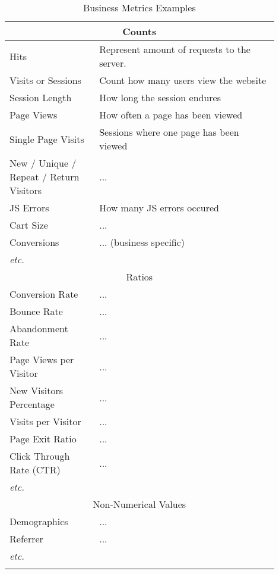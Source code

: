 \begin{center}
	\small
	\begin{longtable}{ | p{0.3\linewidth} | p{0.6\linewidth} | }
	
	\hline
	\multicolumn{2}{|c|}{ \cellcolor{lightgrey} Counts} \\
	\hline
	Hits & Represent amount of requests to the server.  \\ %
	\hline
	Visits or Sessions & Count how many users view the website \\ %
	\hline
	Session Length & How long the session endures \\ %
	\hline
	Page Views & How often a page has been viewed \\ %
	\hline
	Single Page Visits & Sessions where one page has been viewed \\ %
	\hline
	New / Unique / Repeat / Return Visitors & ... \\
	\hline
	JS Errors & How many JS errors occured \\
	\hline
	Cart Size & ... \\
	\hline
	Conversions & ...  (business specific) \\
	\hline
	\textit{etc.} &  \\

	\hline
	\multicolumn{2}{|c|}{ \cellcolor{lightgrey} Ratios} \\
	\hline
	Conversion Rate & ... \\
	\hline
	Bounce Rate & ... \\
	\hline
	Abandonment Rate & ... \\
	\hline
	Page Views per Visitor & ... \\
	\hline
	New Visitors Percentage & ... \\
	\hline
	Visits per Visitor & ... \\
	\hline
	Page Exit Ratio & ... \\
	\hline
	Click Through Rate (CTR) & ... \\
	\hline
	\textit{etc.} & \\	
	
	\hline
	\multicolumn{2}{|c|}{ \cellcolor{lightgrey} Non-Numerical Values} \\
	\hline
	Demographics & ... \\	
	\hline
	Referrer & ... \\	
	\hline
	\textit{etc.} &  \\
	\hline
	
	\caption{Business Metrics Examples}
	\label{table:businessmetrics}
	\end{longtable}
\end{center}


